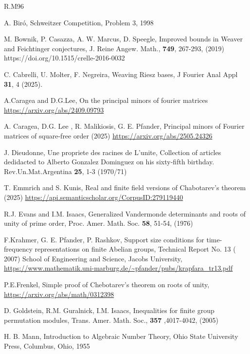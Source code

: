 \documentclass[a4paper,12pt,reqno]{amsart}
\begin{document}
\begin{thebibliography}{{R.M}96}


 A. Bir\'o, Schweitzer Competition, Problem 3, 1998


 M. Bownik, P. Casazza, A. W. Marcus, D. Speegle, Improved bounds in Weaver and Feichtinger conjectures, J. Reine Angew. Math., {\bf 749}, 267-293,  (2019) https://doi.org/10.1515/crelle-2016-0032 

 C. Cabrelli, U. Molter, F. Negreira, Weaving Riesz bases, J Fourier Anal Appl {\bf 31}, 4 (2025). 


A.Caragea and D.G.Lee, On the principal minors of fourier matrices
\url{https://arxiv.org/abs/2409.09793}


 A. Caragea, D.G. Lee , R. Malikiosis, G. E. Pfander, Principal minors of Fourier matrices of square-free order (2025)
\url{https://arxiv.org/abs/2505.24326}

J. Dieudonne, Une propriete des racines de L'unite, Collection of articles dedidacted to Alberto Gonzalez Dominguez on his sixty-fifth birthday. Rev.Un.Mat.Argentina {\bf 25}, 1-3 (1970/71)

T. Emmrich and S. Kunis, Real and finite field versions of Chabotarev's theorem (2025)
\url{https://api.semanticscholar.org/CorpusID:279119440}


R.J. Evans and I.M. Isaacs, Generalized Vandermonde determinants and roots of unity of prime order, Proc. Amer. Math. Soc. {\bf 58}, 51-54, (1976) 


F.Krahmer, G. E. Pfander, P. Rashkov, 
Support size conditions for time-frequency
representations on finite Abelian groups, Technical Report No. 13 ( 2007)
School of Engineering and Science, Jacobs University, 
\url{https://www.mathematik.uni-marburg.de/~pfander/pubs/krapfara_tr13.pdf}

P.E.Frenkel, Simple proof of Chebotarev's theorem on roots of unity, \url{https://arxiv.org/abs/math/0312398}

D. Goldstein, R.M. Guralnick, I.M. Isaacs, Inequalities for finite group permutation modules, Trans. Amer. Math. Soc., {\bf 357 },4017-4042, (2005)



H. B. Mann, Introduction  to Algebraic Number Theory, Ohio State University Press, Columbus, Ohio, 1955


\end{thebibliography}
\end{document}

